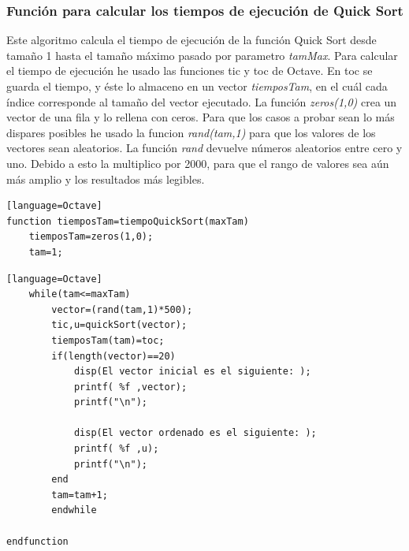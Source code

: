 \documentclass[a4,12pt]{article}
\begin{document}
\subsubsection{Función para calcular los tiempos de ejecución de Quick Sort}
Este algoritmo calcula el tiempo de ejecución de la función Quick Sort desde tamaño 1 hasta el tamaño máximo pasado por parametro \emph {tamMax}. Para calcular el tiempo de ejecución he usado las funciones tic y toc de Octave. En toc se guarda el tiempo, y éste lo almaceno en un vector \emph{tiemposTam}, en el cuál cada índice corresponde al tamaño del vector ejecutado.
La función \emph{zeros(1,0)} crea un vector de una fila y lo rellena con ceros.
Para que los casos a probar sean lo más dispares posibles he usado la funcion \emph{rand(tam,1)} para que los valores de los vectores sean aleatorios. La función \emph{rand} devuelve números aleatorios entre cero y uno. Debido a esto la multiplico por 2000, para que el rango de valores sea aún más amplio y los resultados más legibles.
\bigskip %
\lstset{language=Octave}
\begin{lstlisting}[frame=single][language=Octave]
function tiemposTam=tiempoQuickSort(maxTam)
	tiemposTam=zeros(1,0);
	tam=1;
	\end{lstlisting}
	\begin{lstlisting}[frame=single][language=Octave]
	while(tam<=maxTam)
		vector=(rand(tam,1)*500);	
		tic,u=quickSort(vector); 
		tiemposTam(tam)=toc;
		if(length(vector)==20)
			disp(El vector inicial es el siguiente: );
			printf( %f ,vector);
			printf("\n");
			
			disp(El vector ordenado es el siguiente: );
			printf( %f ,u);
			printf("\n");
		end
		tam=tam+1;
		endwhile

endfunction
\end{lstlisting}
\end{document}
